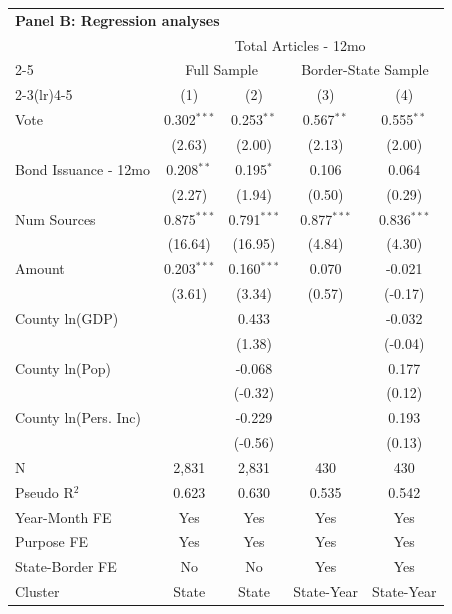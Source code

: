 \begingroup
\centering
\begin{tabular*}{\textwidth}{@{\extracolsep{\fill}}lcccc}
\multicolumn{5}{l}{\textbf{Panel B: Regression analyses}}\\

\addlinespace
   \toprule
    & \multicolumn{4}{c}{Total Articles - 12mo}\\
   \cmidrule(lr){2-5}
    & \multicolumn{2}{c}{Full Sample} & \multicolumn{2}{c}{Border-State Sample}\\
   \cmidrule(lr){2-3}\cmidrule(lr){4-5}
                        & (1)           & (2)           & (3)           & (4)\\  
   \midrule 
   Vote                 & 0.302$^{***}$ & 0.253$^{**}$  & 0.567$^{**}$  & 0.555$^{**}$\\   
                        & (2.63)       & (2.00)       & (2.13)       & (2.00)\\   
   Bond Issuance - 12mo & 0.208$^{**}$  & 0.195$^{*}$   & 0.106         & 0.064\\   
                        & (2.27)       & (1.94)       & (0.50)       & (0.29)\\   
   Num Sources          & 0.875$^{***}$ & 0.791$^{***}$ & 0.877$^{***}$ & 0.836$^{***}$\\   
                        & (16.64)      & (16.95)      & (4.84)       & (4.30)\\   
   Amount               & 0.203$^{***}$ & 0.160$^{***}$ & 0.070         & -0.021\\   
                        & (3.61)       & (3.34)       & (0.57)       & (-0.17)\\   
   County ln(GDP)       &               & 0.433         &               & -0.032\\   
                        &               & (1.38)       &               & (-0.04)\\   
   County ln(Pop)       &               & -0.068        &               & 0.177\\   
                        &               & (-0.32)      &               & (0.12)\\   
   County ln(Pers. Inc) &               & -0.229        &               & 0.193\\   
                        &               & (-0.56)      &               & (0.13)\\   
   \hline
   N         & 2,831         & 2,831         & 430           & 430\\  
   Pseudo R$^2$         & 0.623         & 0.630         & 0.535         & 0.542\\  
   Year-Month FE        & Yes           & Yes           & Yes           & Yes\\  
   Purpose FE           & Yes           & Yes           & Yes           & Yes\\  
   State-Border FE      & No            & No            & Yes           & Yes\\  
   Cluster              & State & State & State-Year & State-Year\\  
   \bottomrule
\end{tabular*}
\par\endgroup
